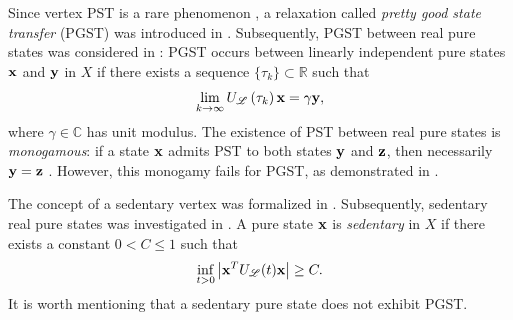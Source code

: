 \documentclass[12pt,a4paper]{article}
\def \x {{\bf x}}
\def \y {{\bf y}}
\def \z {{\bf z}}
\newcommand{\ob}[1]{\left(#1\right)}
\begin{document}
Since vertex PST is a rare phenomenon \cite{god2}, a relaxation called \emph{pretty good state transfer} (PGST) was introduced in \cite{god1, vin}. Subsequently, PGST between real pure states was considered in \cite{pal9}: PGST occurs between linearly independent pure states $\x$ and $\y$ in $X$ if there exists a sequence $\{\tau_k\}\subset \mathbb{R}$ such that
\[
\lim_{k \to \infty} U_\mathscr{L}\ob{\tau_k} \x = \gamma \y,
\]
where $\gamma \in \mathbb{C}$ has unit modulus. The existence of PST between real pure states is \emph{monogamous}: if a state $\x$ admits PST to both states $\y$ and $\z$, then necessarily $\y = \z$ \cite[Lemma 5.1(3)]{god25}. However, this monogamy fails for PGST, as demonstrated in \cite[Example 4.1]{pal5}.

The concept of a sedentary vertex was formalized in \cite{mont}. Subsequently, sedentary real pure states was investigated in \cite{pal9}. A pure state $\x$ is \emph{sedentary} in $X$ if there exists a constant $0 < C \leq 1$ such that
\begin{equation*}
\inf_{t > 0} \left| \x^T U_\mathscr{L}(t) \x \right| \geq C.
\end{equation*}
It is worth mentioning that a sedentary pure state does not exhibit PGST.
\end{document}
